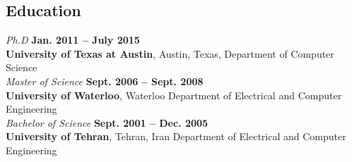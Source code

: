 \documentclass[margin,line,letterpaper]{resume}
\begin{document}
\begin{resume}
\begin{small}
    \section{\mysidestyle Education}
    \textsl{Ph.D}  \hfill \textbf{ Jan. 2011 -- July 2015}\\
    \textbf{University of Texas at Austin}, Austin, Texas, Department of Computer Science\\
%    
    \textsl{Master of Science} \hfill \textbf{ Sept. 2006 -- Sept. 2008}\\\vspace{0mm}%
    \textbf{University of Waterloo}, Waterloo
    Department of Electrical and Computer Engineering\\%
\textsl{Bachelor of Science} \hfill \textbf{ Sept. 2001 -- Dec. 2005}\\
   \textbf{University of Tehran}, Tehran, Iran
    Department of Electrical and Computer Engineering
\vspace{-1mm}



\end{small}
\end{resume}
\end{document}
